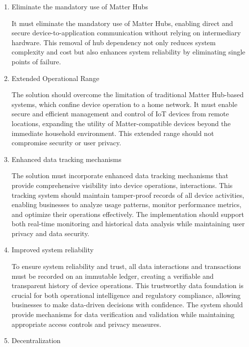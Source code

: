 \documentclass[conference]{IEEEtran}
\begin{document}
	\begin{enumerate}[itemsep=2ex, parsep=1ex]
		\item Eliminate the mandatory use of Matter Hubs

			It must eliminate the mandatory use of Matter Hubs, enabling direct and secure
			device-to-application communication without relying on intermediary hardware.
			This removal of hub dependency not only reduces system complexity and cost
			but also enhances system reliability by eliminating single points of
			failure.

		\item Extended Operational Range

			The solution should overcome the limitation of traditional Matter Hub-based
			systems, which confine device operation to a home network. It must enable
			secure and efficient management and control of IoT devices from remote
			locations, expanding the utility of Matter-compatible devices beyond the immediate
			household environment. This extended range should not compromise security
			or user privacy.

		\item Enhanced data tracking mechanisms

			The solution must incorporate enhanced data tracking mechanisms that
			provide comprehensive visibility into device operations, interactions.
			This tracking system should maintain tamper-proof records of all device
			activities, enabling businesses to analyze usage patterns, monitor
			performance metrics, and optimize their operations effectively. The
			implementation should support both real-time monitoring and historical
			data analysis while maintaining user privacy and data security.

		\item Improved system reliability

			To ensure system reliability and trust, all data interactions and transactions
			must be recorded on an immutable ledger, creating a verifiable and
			transparent history of device operations. This trustworthy data foundation
			is crucial for both operational intelligence and regulatory compliance,
			allowing businesses to make data-driven decisions with confidence. The system
			should provide mechanisms for data verification and validation while maintaining
			appropriate access controls and privacy measures.

		\item Decentralization


\end{enumerate}
\end{document}
